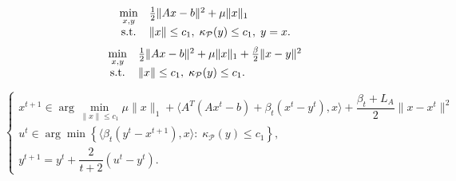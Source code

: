 \documentclass{article}
\numberwithin{equation}{section}
\begin{document}
\begin{equation}
	\begin{array}{cl}
	\min\limits_{x,y} & \frac12\|Ax-b\|^2 +\mu \|x\|_1\\
	{\rm s.t.} & \|x\|\le c_1,\; \kappa_{\mathcal{P}}(y)\leq c_1, \; y=x.
	\end{array}
\end{equation}
\begin{equation}
	\begin{array}{cl}
	\min\limits_{x,y}  & \frac12\|Ax-b\|^2 +\mu \|x\|_1 + \frac{\beta}{2}\|x-y\|^2\\
		{\rm s.t.} & \|x\|\le c_1,\; \kappa_{\mathcal{P}}(y)\leq c_1.
	\end{array}
\end{equation}

\begin{equation}
\left\{
\begin{array}{l}
x^{t+1} \in \arg\min\limits_{ \|x\|\le c_1} \mu\|x\|_1 + \langle A^T(Ax^t-b)+\beta_t(x^t-y^t), x\rangle+\dfrac{\beta_t+L_A}{2}\|x - x^t\|^2\\
u^t \in \arg\min \left\{\langle\beta_t(y^t - x^{t+1}), x\rangle :\;\kappa_{\mathcal{P}}(y)\le c_1 \right\},\\
y^{t+1} = y^t+\dfrac{2}{t+2}(u^t-y^t).
\end{array}
\right.
\end{equation}
\end{document}
